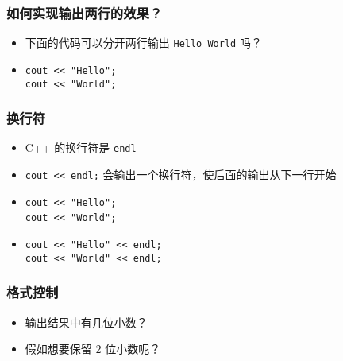 \begin{frame}[fragile]
    \frametitle{如何实现输出两行的效果？}

    \begin{itemize}
        \item 下面的代码可以分开两行输出 \lstinline|Hello World| 吗？

        \item
            \lstinline|cout << "Hello";|\\ 
            \lstinline|cout << "World";|
    \end{itemize}
\end{frame}

\begin{frame}[fragile]
    \frametitle{换行符}

    \begin{itemize}
        \item<1-> C++ 的换行符是 \lstinline|endl|

        \item<2-> \lstinline|cout << endl;| 会输出一个换行符，使后面的输出从下一行开始

        \item<3->
             {
                \lstinline|cout << "Hello";|\\ 
                \lstinline|cout << "World";|
            }{
                \\ 
            }

        \item<4->
            \lstinline|cout << "Hello" << endl;|\\ 
            \lstinline|cout << "World" << endl;|
    \end{itemize}
\end{frame}

\begin{frame}[fragile]
    \frametitle{格式控制}

    

    \begin{itemize}
        \item<2-> 输出结果中有几位小数？
        \item<2-> 假如想要保留 $2$ 位小数呢？
    \end{itemize}
\end{frame}

